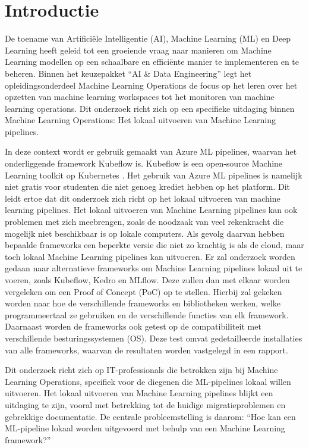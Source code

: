 
\section{Introductie}%
\label{sec:introductie}

De toename van Artificiële Intelligentie (AI), Machine Learning (ML) en Deep Learning heeft geleid tot een groeiende vraag naar manieren om Machine Learning modellen op een schaalbare en efficiënte manier te implementeren en te beheren.
Binnen het keuzepakket ``AI \& Data Engineering'' legt het opleidingsonderdeel Machine Learning Operations de focus op het leren over het opzetten van machine learning workspaces tot het monitoren van machine learning operations.
Dit onderzoek richt zich op een specifieke uitdaging binnen Machine Learning Operations: Het lokaal uitvoeren van Machine Learning pipelines.\newline

In deze context wordt er gebruik gemaakt van Azure ML pipelines, waarvan het onderliggende framework Kubeflow is. Kubeflow is een open-source Machine Learning toolkit op Kubernetes \autocite{Kubeflow2021}.
Het gebruik van Azure ML pipelines is namelijk niet gratis voor studenten die niet genoeg krediet hebben op het platform. Dit leidt ertoe dat dit onderzoek zich richt op het lokaal uitvoeren van machine learning pipelines.
Het lokaal uitvoeren van Machine Learning pipelines kan ook problemen met zich meebrengen, zoals de noodzaak van veel rekenkracht die mogelijk niet beschikbaar is op lokale computers. Als gevolg daarvan hebben bepaalde frameworks een beperkte versie die niet zo krachtig is als de cloud, maar toch lokaal Machine Learning pipelines kan uitvoeren.
Er zal onderzoek worden gedaan naar alternatieve frameworks om Machine Learning pipelines lokaal uit te voeren, zoals Kubeflow, Kedro en MLflow. Deze zullen dan met elkaar worden vergeleken om een Proof of Concept (PoC) op te stellen. Hierbij zal gekeken worden naar hoe de verschillende frameworks en bibliotheken werken, welke programmeertaal ze gebruiken en de verschillende functies van elk framework.
Daarnaast worden de frameworks ook getest op de compatibiliteit met verschillende besturingssystemen (OS). Deze test omvat gedetailleerde installaties van alle frameworks, waarvan de resultaten worden vastgelegd in een rapport.\newline

Dit onderzoek richt zich op IT-professionals die betrokken zijn bij Machine Learning Operations, specifiek voor de diegenen die ML-pipelines lokaal willen uitvoeren.
Het lokaal uitvoeren van Machine Learning pipelines blijkt een uitdaging te zijn, vooral met betrekking tot de huidige migratieproblemen en gebrekkige documentatie.
De centrale probleemstelling is daarom: ``Hoe kan een ML-pipeline lokaal worden uitgevoerd met behulp van een Machine Learning framework?''

